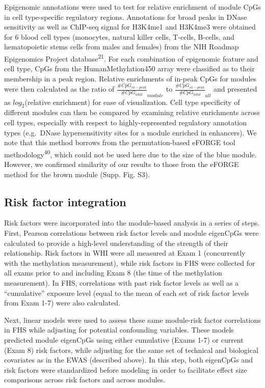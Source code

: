 \documentclass[]{article}
\theoremstyle{definition}
\theoremstyle{definition}
\theoremstyle{definition}
\theoremstyle{remark}
\begin{document}
Epigenomic annotations were used to test for relative enrichment of
module CpGs in cell type-specific regulatory regions. Annotations for
broad peaks in DNase sensitivity as well as ChIP-seq signal for H3K4me1
and H3K4me3 were obtained for 6 blood cell types (monocytes, natural
killer cells, T-cells, B-cells, and hematopoietic stems cells from males
and females) from the NIH Roadmap Epigenomics Project
database\textsuperscript{21}. For each combination of epigenomic feature
and cell type, CpGs from the HumanMethylation450 array were classified
as to their membership in a peak region. Relative enrichments of in-peak
CpGs for modules were then calculated as the ratio of
\(\frac{\#CpG_{in-peak}}{\#CpG_{total}}_{module}\) to
\(\frac{\#CpG_{in-peak}}{\#CpG_{total}}_{all}\) and presented as
\(log_2\)(relative enrichment) for ease of visualization. Cell type
specificity of different modules can then be compared by examining
relative enrichments across cell types, especially with respect to
highly-represented regulatory annotation types (e.g.~DNase
hypersensitivity sites for a module enriched in enhancers). We note that
this method borrows from the permutation-based eFORGE tool
methodology\textsuperscript{40}, which could not be used here due to the
size of the blue module. However, we confirmed similarity of our results
to those from the eFORGE method for the brown module (Supp. Fig. S3).

\subsection{Risk factor integration}\label{risk-factor-integration}

Risk factors were incorporated into the module-based analysis in a
series of steps. First, Pearson correlations between risk factor levels
and module eigenCpGs were calculated to provide a high-level
understanding of the strength of their relationship. Risk factors in WHI
were all measured at Exam 1 (concurrently with the methylation
measurement), while risk factors in FHS were collected for all exams
prior to and including Exam 8 (the time of the methylation measurement).
In FHS, correlations with past risk factor levels as well as a
``cumulative'' exposure level (equal to the mean of each set of risk
factor levels from Exam 1-7) were also calculated.

Next, linear models were used to assess these same module-risk factor
correlations in FHS while adjusting for potential confounding variables.
These models predicted module eigenCpGs using either cumulative (Exams
1-7) or current (Exam 8) risk factors, while adjusting for the same set
of technical and biological covariates as in the EWAS (described above).
In this step, both eigenCpGs and risk factors were standardized before
modeling in order to facilitate effect size comparisons across risk
factors and across modules.
\end{document}
